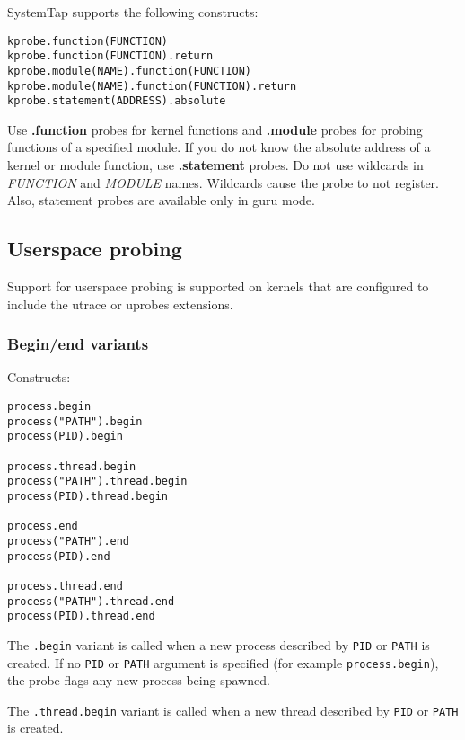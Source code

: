 \documentclass[twoside,english]{article}
\newenvironment{vindent}
{\begin{list}{}{\setlength{\listparindent}{6pt}}
\item[]}
{\end{list}}
\begin{document}
SystemTap supports the following constructs:
\begin{vindent}
\begin{verbatim}
kprobe.function(FUNCTION)
kprobe.function(FUNCTION).return
kprobe.module(NAME).function(FUNCTION)
kprobe.module(NAME).function(FUNCTION).return
kprobe.statement(ADDRESS).absolute
\end{verbatim}
\end{vindent}

Use \textbf{.function} probes for kernel functions and
\textbf{.module} probes for probing functions of a specified module.
If you do not know the absolute address of a kernel or module
function, use \textbf{.statement} probes. Do not use wildcards in
\textit{FUNCTION} and \textit{MODULE} names. Wildcards cause the probe
to not register. Also, statement probes are available only in guru mode.


\subsection{Userspace probing}
Support for userspace probing is supported on kernels that are
configured to include the utrace or uprobes extensions.

\subsubsection{Begin/end variants}
\label{sec:beginendvariants}
Constructs:
\begin{vindent}
\begin{verbatim}
process.begin
process("PATH").begin
process(PID).begin

process.thread.begin
process("PATH").thread.begin
process(PID).thread.begin

process.end
process("PATH").end
process(PID).end

process.thread.end
process("PATH").thread.end
process(PID).thread.end
\end{verbatim}
\end{vindent}

The \texttt{.begin} variant is called when a new process described by
\texttt{PID} or \texttt{PATH} is created. If no \texttt{PID} or
\texttt{PATH} argument is specified (for example
\texttt{process.begin}), the probe flags any new process being
spawned.

The \texttt{.thread.begin} variant is called when a new thread
described by \texttt{PID} or \texttt{PATH} is created.
\end{document}
